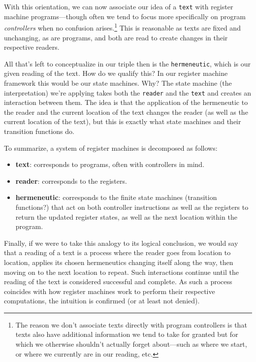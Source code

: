 \documentclass[twoside]{article}
\newcommand{\strong}[1]{{\bfseries #1}}
\newcommand{\pdfnote}[1]{\:\footnote{#1}}
\begin{document}
With this orientation, we can now associate our idea of a \texttt{text} with register machine programs---though often
we tend to focus more specifically on program \emph{controllers} when no confusion arises.\pdfnote{The reason we don't
associate texts directly with program controllers is that texts also have additional information we tend to take for
granted but for which we otherwise shouldn't actually forget about---such as where we start, or where we currently are
in our reading, etc.} This is reasonable as texts are fixed and unchanging, as are programs, and both are read to create
changes in their respective readers.

All that's left to conceptualize in our triple then is the \texttt{hermeneutic}, which is our given reading of the text.
How do we qualify this? In our register machine framework this would be our state machines. Why? The state machine
(the interpretation) we're applying takes both the \texttt{reader} and the \texttt{text} and creates an interaction
between them. The idea is that the application of the hermeneutic to the reader and the current location of the text
changes the reader (as well as the current location of the text), but this is exactly what state machines and their
transition functions do.

To summarize, a system of register machines is decomposed as follows:

\begin{itemize}
\item \strong{text}: corresponds to programs, often with controllers in mind.
\item \strong{reader}: corresponds to the registers.
\item \strong{hermeneutic}: corresponds to the finite state machines (transition functions?) that act on both
	controller instructions as well as the registers to return the updated register states, as well as the next
	location within the program.
\end{itemize}

Finally, if we were to take this analogy to its logical conclusion, we would say that a reading of a text is a process
where the reader goes from location to location, applies its chosen hermeneutics changing itself along the way, then moving
on to the next location to repeat. Such interactions continue until the reading of the text is considered successful
and complete. As such a process coincides with how register machines work to perform their respective computations,
the intuition is confirmed (or at least not denied).
\end{document}
